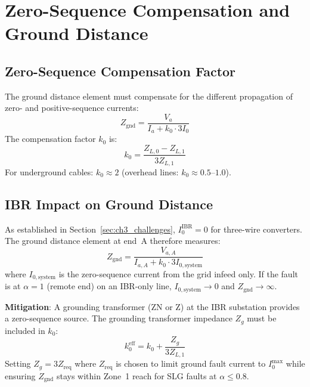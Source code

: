 \section{Zero-Sequence Compensation and Ground Distance}
\label{sec:ch7_ground_distance}

\subsection{Zero-Sequence Compensation Factor}

The ground distance element must compensate for the different propagation
of zero- and positive-sequence currents:
\begin{equation}
  Z_\mathrm{gnd} = \frac{V_a}{I_a + k_0 \cdot 3I_0}
  \label{eq:ch5_znd_comp}
\end{equation}
The compensation factor $k_0$ is:
\begin{equation}
  k_0 = \frac{Z_{L,0} - Z_{L,1}}{3 Z_{L,1}}
  \label{eq:ch5_k0}
\end{equation}
For underground cables: $k_0 \approx 2$ (overhead lines: $k_0 \approx 0.5$--$1.0$).

\subsection{IBR Impact on Ground Distance}

As established in Section~\ref{sec:ch3_challenges}, $I_0^\mathrm{IBR} = 0$
for three-wire converters. The ground distance element at end~A therefore
measures:
\begin{equation}
  Z_\mathrm{gnd} = \frac{V_{a,A}}{I_{a,A} + k_0 \cdot 3I_{0,\mathrm{system}}}
  \label{eq:ch5_znd_ibr}
\end{equation}
where $I_{0,\mathrm{system}}$ is the zero-sequence current from the
grid infeed only. If the fault is at $\alpha = 1$ (remote end) on an
IBR-only line, $I_{0,\mathrm{system}} \to 0$ and $Z_\mathrm{gnd} \to \infty$.

\textbf{Mitigation}: A grounding transformer (ZN or Z) at the IBR substation
provides a zero-sequence source. The grounding transformer impedance
$Z_{g}$ must be included in $k_0$:
\begin{equation}
  k_0^\mathrm{eff} = k_0 + \frac{Z_g}{3 Z_{L,1}}
  \label{eq:ch5_k0_eff}
\end{equation}
Setting $Z_g = 3Z_\mathrm{req}$ where $Z_\mathrm{req}$ is chosen to limit
ground fault current to $I_0^\mathrm{max}$ while ensuring $Z_\mathrm{gnd}$
stays within Zone~1 reach for SLG faults at $\alpha \leq 0.8$.

